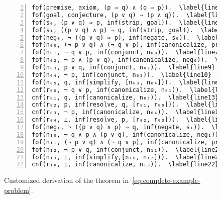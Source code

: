\begin{figure}
\begin{Verbatim}[commandchars=\\\{\}, numbers=left,xleftmargin=5mm]
fof(premise, axiom, (p ⇒ q) ∧ (q ⇒ p)).  \label{line1}
fof(goal, conjecture, (p ∨ q) ⇒ (p ∧ q)).  \label{line2}
fof(s₀, (p ∨ q) ⇒ p, inf(strip, goal)).  \label{line3}
fof(s₁, ((p ∨ q) ∧ p) ⇒ q, inf(strip, goal)).  \label{line4}
fof(neg₀, ¬ ((p ∨ q) ⇒ p), inf(negate, s₀)).  \label{line5}
fof(n₀₀, (¬ p ∨ q) ∧ (¬ q ∨ p), inf(canonicalize, premise)).  \label{line6}
fof(n₀₁, ¬ q ∨ p, inf(conjunct, n₀₀)).  \label{line7}
fof(n₀₂, ¬ p ∧ (p ∨ q), inf(canonicalize, neg₀)).  \label{line8}
fof(n₀₃, p ∨ q, inf(conjunct, n₀₂)).  \label{line9}
fof(n₀₄, ¬ p, inf(conjunct, n₀₂)).  \label{line10}
fof(n₀₅, q, inf(simplify, [n₀₃, n₀₄])).  \label{line11}
cnf(r₀₀, ¬ q ∨ p, inf(canonicalize, n₀₁)).  \label{line12}
cnf(r₀₁, q, inf(canonicalize, n₀₅)).  \label{line13}
cnf(r₀₂, p, inf(resolve, q, [r₀₁, r₀₀])).  \label{line14}
cnf(r₀₃, ¬ p, inf(canonicalize, n₀₄)).  \label{line15}
cnf(r₀₄, ⊥, inf(resolve, p, [r₀₂, r₀₃])).  \label{line16}
fof(neg₁, ¬ ((p ∨ q) ∧ p) ⇒ q, inf(negate, s₁)).  \label{line17}
fof(n₁₀, ¬ q ∧ p ∧ (p ∨ q), inf(canonicalize, neg₁)).  \label{line18}
fof(n₁₁, (¬ p ∨ q) ∧ (¬ q ∨ p), inf(canonicalize, premise)).  \label{line19}
fof(n₁₂, ¬ p ∨ q, inf(conjunct, n₁₁)).  \label{line20}
fof(n₁₃, ⊥, inf(simplify,[n₁₀, n₁₂])).  \label{line21}
cnf(r₁₀, ⊥, inf(canonicalize, n₁₃)).  \label{line22}
\end{Verbatim}
\caption{Customized \Metis \TSTP derivation of the theorem in~\eqref{eq:complete-example-problem}.}
\label{complete-metis-example}
\end{figure}

